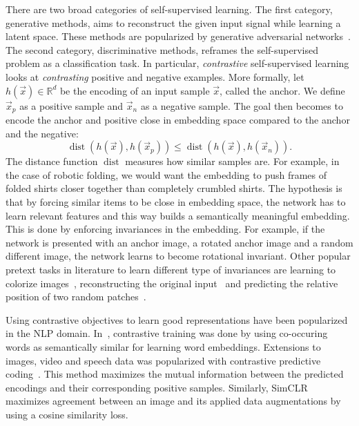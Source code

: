 \documentclass[\home/main.tex]{subfiles}
\begin{document}
There are two broad categories of self-supervised learning. The first category, generative methods, aims to reconstruct the given input signal while learning a latent space. These methods are popularized by generative adversarial networks~\autocite{goodfellow2014generative}. The second category, discriminative methods, reframes the self-supervised problem as a classification task. In particular, \emph{contrastive} self-supervised learning looks at \textit{contrasting} positive and negative examples. More formally, let \( h( \vec{x} ) \in \mathbb{R}^d \) be the encoding of an input sample \( \vec{x} \), called the anchor. We define \( \vec{x}_p \) as a positive sample and \( \vec{x}_n \) as a negative sample. The goal then becomes to encode the anchor and positive close in embedding space compared to the anchor and the negative:
\begin{equation*}
	\operatorname{dist}{\left( h(\vec{x}),h(\vec{x}_p) \right)} \leq \operatorname{dist}{\left( h(\vec{x}),h(\vec{x}_n) \right)} .
\end{equation*}
The distance function $\operatorname{dist}{}$ measures how similar samples are. For example, in the case of robotic folding, we would want the embedding to push frames of folded shirts closer together than completely crumbled shirts. The hypothesis is that by forcing similar items to be close in embedding space, the network has to learn relevant features and this way builds a semantically meaningful embedding. This is done by enforcing invariances in the embedding. For example, if the network is presented with an anchor image, a rotated anchor image and a random different image, the network learns to become rotational invariant. Other popular pretext tasks in literature to learn different type of invariances are learning to colorize images~\autocite{Zhang2016Color}, reconstructing the original input~\autocite{Pathak2016} and predicting the relative position of two random patches~\autocite{Doersch2015}.


Using contrastive objectives to learn good representations have been popularized in the NLP domain. In~\autocite{mikolov2013distributed}, contrastive training was done by using co-occuring words as semantically similar for learning word embeddings. Extensions to images, video and speech data was popularized with contrastive predictive coding~\autocite{oord2018representation}. This method maximizes the mutual information between the predicted encodings and their corresponding positive samples. Similarly, SimCLR~\autocite{chen2020simple} maximizes agreement between an image and its applied data augmentations by using a cosine similarity loss.
\end{document}
